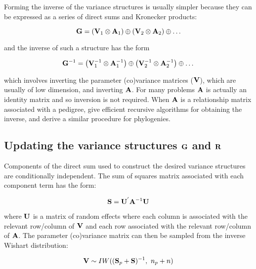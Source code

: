 \documentclass{article}
\begin{document}
Forming the inverse of the variance structures is usually simpler because they can be expressed as a series of direct sums and Kronecker products:

\begin{equation}
{\bf G}= \left({\bf V}_{1}\otimes{\bf A}_{1}\right) \oplus \left({\bf V}_{2}\otimes{\bf A}_{2}\right) \oplus \ldots
\label{G3-Eq}
\end{equation}

and the inverse of such a structure has the form 

\begin{equation}
{\bf G}^{-1} = \left({\bf V}^{-1}_{1}\otimes{\bf A}^{-1}_{1}\right) \oplus \left({\bf V}^{-1}_{2}\otimes{\bf A}^{-1}_{2}\right) \oplus \ldots\\
\end{equation}

which involves inverting the parameter (co)variance matrices (${\bf V}$), which are usually of low dimension, and inverting ${\bf A}$. For many problems ${\bf A}$ is actually an identity matrix and so inversion is not required.  When ${\bf A}$ is a relationship matrix associated with a pedigree, \citet{Henderson.1976, Meuwissen.1992} give efficient recursive algorithms for obtaining the inverse, and \citet{Hadfield.2010b} derive a similar procedure for phylogenies.
 
\subsection[Updating the variance structures]{Updating the variance structures ${\bf G}$ and ${\bf R}$}

Components of the direct sum used to construct the desired variance structures are conditionally independent.  The sum of squares matrix associated with each component term has the form:

\begin{equation}
{\bf S} = {\bf U}^{'}{\bf A}^{-1}{\bf U}
\end{equation}

where ${\bf U}$ is a matrix of random effects where each column is associated with the relevant row/column of ${\bf V}$ and each row associated with the relevant row/column of ${\bf A}$. The parameter (co)variance matrix can then be sampled from the inverse Wishart distribution:


\begin{equation}
{\bf V} \sim IW(({\bf S}_{p}+{\bf S})^{-1},\ n_{p}+n)
\label{pIW-Eq}
\end{equation}
\end{document}
